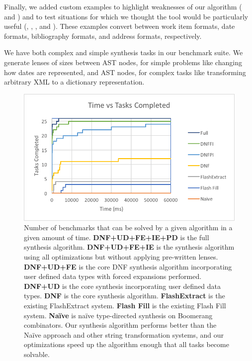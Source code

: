 \documentclass[acmsmall]{acmart}
\begin{document}
Finally, we added custom examples to highlight weaknesses of
our algorithm ( and ) 
and to test situations for which we thought the tool would be
particularly useful (, , ,
and ).   These examples convert between work item formats, date
formats, bibliography formats, and address formats, respectively.

We have both complex and simple synthesis tasks in our benchmark suite.
We generate lenses of sizes between  AST
nodes, for simple problems like changing how dates are represented, and
 AST nodes, for complex tasks like transforming arbitrary XML to a
dictionary representation. 

\begin{figure}
  \includegraphics{SynthesisTimes}
  \caption{
    Number of benchmarks that can be solved by a given algorithm in a given
    amount of time. {\bf DNF+UD+FE+IE+PD} is the full synthesis algorithm.
    {\bf DNF+UD+FE+IE} is
    the synthesis algorithm using all optimizations but without applying
    pre-written lenses.  {\bf DNF+UD+FE} is the core DNF synthesis algorithm
    incorporating user defined data types with
    forced expansions performed.  {\bf DNF+UD} is the core synthesis incorporating 
    user defined data types.  {\bf DNF} is the core synthesis algorithm.  {\bf
      FlashExtract} is the existing FlashExtract system.  {\bf Flash Fill} is
    the existing Flash Fill system.  {\bf Na\"{i}ve} is na\"{i}ve type-directed 
    synthesis on Boomerang combinators.  Our synthesis algorithm performs
    better than the Na\"{i}ve approach and other string transformation systems,
    and our optimizations speed up the algorithm enough that all tasks become
    solvable.
  }
  \label{fig:synthesis-times}
\end{figure}
\end{document}
